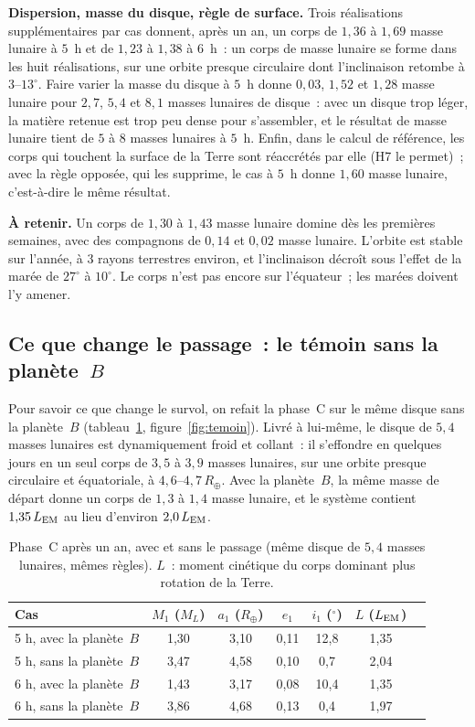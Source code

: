 \documentclass[11pt,a4paper]{article}
\newcommand{\Rt}{\ensuremath{R_\oplus}}
\newcommand{\ML}{\ensuremath{M_L}}
\newcommand{\LEM}{\ensuremath{L_{\rm EM}}}
\begin{document}
\textbf{Dispersion, masse du disque, règle de surface.} Trois réalisations supplémentaires par cas donnent, après un an, un corps de $1{,}36$ à $1{,}69$ masse lunaire à $5$~h et de $1{,}23$ à $1{,}38$ à $6$~h~: un corps de masse lunaire se forme dans les huit réalisations, sur une orbite presque circulaire dont l'inclinaison retombe à $3$--$13^\circ$. Faire varier la masse du disque à $5$~h donne $0{,}03$, $1{,}52$ et $1{,}28$ masse lunaire pour $2{,}7$, $5{,}4$ et $8{,}1$ masses lunaires de disque~: avec un disque trop léger, la matière retenue est trop peu dense pour s'assembler, et le résultat de masse lunaire tient de $5$ à $8$ masses lunaires à $5$~h. Enfin, dans le calcul de référence, les corps qui touchent la surface de la Terre sont réaccrétés par elle (H7 le permet)~; avec la règle opposée, qui les supprime, le cas à $5$~h donne $1{,}60$ masse lunaire, c'est-à-dire le même résultat.

\textbf{À retenir.} Un corps de $1{,}30$ à $1{,}43$ masse lunaire domine dès les premières semaines, avec des compagnons de $0{,}14$ et $0{,}02$ masse lunaire. L'orbite est stable sur l'année, à $3$ rayons terrestres environ, et l'inclinaison décroît sous l'effet de la marée de $27^\circ$ à $10^\circ$. Le corps n'est pas encore sur l'équateur~; les marées doivent l'y amener.

\subsection{Ce que change le passage~: le témoin sans la planète~$B$}
\label{sec:control}

Pour savoir ce que change le survol, on refait la phase~C sur le même disque sans la planète~$B$ (tableau~\ref{tab:control}, figure~\ref{fig:temoin}). Livré à lui-même, le disque de $5{,}4$ masses lunaires est dynamiquement froid et collant~: il s'effondre en quelques jours en un seul corps de $3{,}5$ à $3{,}9$ masses lunaires, sur une orbite presque circulaire et équatoriale, à $4{,}6$--$4{,}7\,\Rt$. Avec la planète~$B$, la même masse de départ donne un corps de $1{,}3$ à $1{,}4$ masse lunaire, et le système contient $1{,}35\,\LEM$ au lieu d'environ $2{,}0\,\LEM$.

\begin{table}[htbp]
\centering
\caption{Phase~C après un an, avec et sans le passage (même disque de $5{,}4$ masses lunaires, mêmes règles). $L$~: moment cinétique du corps dominant plus rotation de la Terre.\label{tab:control}}
\small
\begin{tabular}{lcccccc}
\toprule
Cas & $M_1$ ($\ML$) & $a_1$ ($\Rt$) & $e_1$ & $i_1$ ($^\circ$) & $L$ ($\LEM$) \\
\midrule
5 h, avec la planète~$B$ & 1,30 & 3,10 & 0,11 & 12,8 & 1,35 \\
5 h, sans la planète~$B$ & 3,47 & 4,58 & 0,10 & 0,7 & 2,04 \\
6 h, avec la planète~$B$ & 1,43 & 3,17 & 0,08 & 10,4 & 1,35 \\
6 h, sans la planète~$B$ & 3,86 & 4,68 & 0,13 & 0,4 & 1,97 \\
\bottomrule
\end{tabular}
\end{table}
\end{document}
